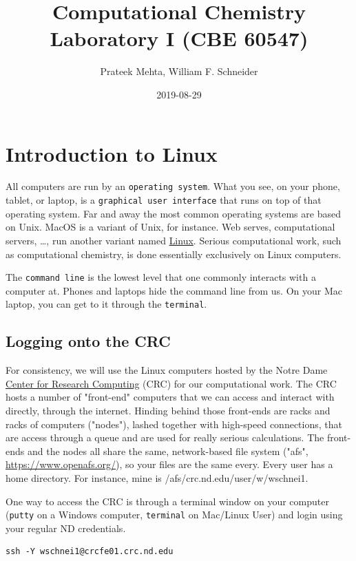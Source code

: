 \documentclass[11pt]{article}
\author{Prateek Mehta, William F. Schneider}
\date{2019-08-29}
\title{Computational Chemistry Laboratory I (CBE 60547)}
\begin{document}
\maketitle

\section{Introduction to Linux}
\label{sec:orgfd01c41}

All computers are run by an \texttt{operating system}.  What you see, on your phone, tablet, or
laptop, is a \texttt{graphical user interface} that runs on top of that operating system.  Far
and away the most common operating systems are based on Unix.  MacOS is a variant of Unix,
for instance. Web serves, computational servers, \ldots{}, run another variant named \href{https://www.linux.org/}{Linux}.
Serious computational work, such as computational chemistry, is done essentially
exclusively on Linux computers.

The \texttt{command line} is the lowest level that one commonly interacts with a computer at.
Phones and laptops hide the command line from us. On your Mac laptop, you can get to it
through the \texttt{terminal}.

\subsection{Logging onto the CRC}
\label{sec:org7ada267}
For consistency, we will use the Linux computers hosted by the Notre Dame \href{http://crc.nd.edu}{Center for
Research Computing} (CRC) for our computational work. The CRC hosts a number of "front-end"
computers that we can access and interact with directly, through the internet.  Hinding
behind those front-ends are racks and racks of computers ("nodes"), lashed together with
high-speed connections, that are access through a queue and are used for really serious
calculations.  The front-ends and the nodes all share the same, network-based file system
("afs", \url{https://www.openafs.org/}), so your files are the same every.  Every user has a
home directory.  For instance, mine is /afs/crc.nd.edu/user/w/wschnei1.  

One way to access the CRC is through a terminal window on your computer (\texttt{putty} on a
Windows computer, \texttt{terminal} on Mac/Linux User) and login using your regular ND
credentials.

\begin{verbatim}
ssh -Y wschnei1@crcfe01.crc.nd.edu
\end{verbatim}
\end{document}
